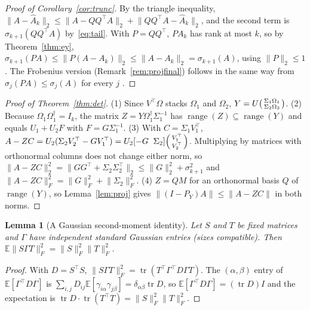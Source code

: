 \documentclass[10pt]{article}
\theoremstyle{plain}
\newtheorem{lemma}[theorem]{Lemma}
\theoremstyle{definition}
\theoremstyle{remark}
\newcommand{\E}{\mathbb{E}}
\newcommand{\T}{^{\top}}
\newcommand{\opn}[1]{\lVert #1\rVert_2}
\newcommand{\fro}[1]{\lVert #1\rVert_F}
\newcommand{\norm}[1]{\lVert #1\rVert}
\DeclareMathOperator{\tr}{tr}
\DeclareMathOperator{\range}{range}
\begin{document}
\begin{proof}[Proof of Corollary~\ref{cor:trunc}]
By the triangle inequality, $\opn{A-\hat A_k}\le\opn{A-QQ\T A}+\opn{QQ\T A-\hat A_k}$, and the second term is $\sigma_{k+1}(QQ\T A)$ by~\eqref{eq:tail}. With $P=QQ\T$, $PA_k$ has rank at most $k$, so by Theorem~\ref{thm:ey}, $\sigma_{k+1}(PA)\le\opn{P(A-A_k)}\le\opn{A-A_k}=\sigma_{k+1}(A)$, using $\opn P\le1$. The Frobenius version (Remark~\ref{rem:projfinal}) follows in the same way from $\sigma_j(PA)\le\sigma_j(A)$ for every $j$ \cite{golubvanloan2013}.
\end{proof}

\begin{proof}[Proof of Theorem~\ref{thm:det}]
(1) Since $V\T\Omega$ stacks $\Omega_1$ and $\Omega_2$, $Y=U\begin{psmallmatrix}\Sigma_1\Omega_1\\\Sigma_2\Omega_2\end{psmallmatrix}$.
(2) Because $\Omega_1\Omega_1^\dagger=I_k$, the matrix $Z=Y\Omega_1^\dagger\Sigma_1^{-1}$ has $\range(Z)\subseteq\range(Y)$ and equals $U_1+U_2F$ with $F=G\Sigma_1^{-1}$.
(3) With $C=\Sigma_1V_1\T$, $A-ZC=U_2(\Sigma_2V_2\T-GV_1\T)=U_2[-G\;\;\Sigma_2]\begin{psmallmatrix}V_1\T\\V_2\T\end{psmallmatrix}$. Multiplying by matrices with orthonormal columns does not change either norm, so $\opn{A-ZC}^2=\opn{GG\T+\Sigma_2\Sigma_2\T}\le\opn G^2+\sigma_{k+1}^2$ and $\fro{A-ZC}^2=\fro G^2+\fro{\Sigma_2}^2$.
(4) $Z=QM$ for an orthonormal basis $Q$ of $\range(Y)$, so Lemma~\ref{lem:proj} gives $\norm{(I-P_Y)A}\le\norm{A-ZC}$ in both norms.
\end{proof}

\begin{lemma}[A Gaussian second-moment identity]\label{lem:gauss}
Let $S$ and $T$ be fixed matrices and $\Gamma$ have independent standard Gaussian entries (sizes compatible). Then $\E\fro{S\Gamma T}^2=\fro S^2\fro T^2$.
\end{lemma}
\begin{proof}
With $D=S\T S$, $\fro{S\Gamma T}^2=\tr(T\T\Gamma\T D\Gamma T)$. The $(\alpha,\beta)$ entry of $\E[\Gamma\T D\Gamma]$ is $\sum_{i,j}D_{ij}\E[\gamma_{i\alpha}\gamma_{j\beta}]=\delta_{\alpha\beta}\tr D$, so $\E[\Gamma\T D\Gamma]=(\tr D)I$ and the expectation is $\tr D\cdot\tr(T\T T)=\fro S^2\fro T^2$.
\end{proof}
\end{document}
